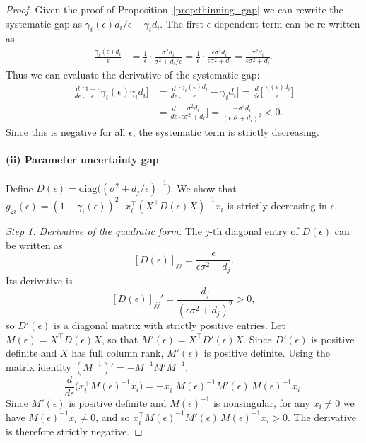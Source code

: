 \documentclass[11pt]{article}
\theoremstyle{plain}
\theoremstyle{definition}
\theoremstyle{remark}
\begin{document}
\begin{proof}
   Given the proof of Proposition~\ref{prop:thinning_gap} we can rewrite the systematic gap as $\gamma_i(\epsilon) d_i / \epsilon - \gamma_i d_i$. The first $\epsilon$ dependent term can be re-written as
\begin{align*}
\frac{\gamma_i(\epsilon) d_i }{\epsilon} &= \frac{1}{\epsilon} \cdot \frac{\sigma^2 d_i}{\sigma^2  + d_i / \epsilon } = \frac{1}{\epsilon} \cdot \frac{ \epsilon \sigma^2  d_i}{\epsilon \sigma^2  + d_i } = \frac{\sigma^2 d_i}{\epsilon \sigma^2  + d_i }.
\end{align*}
Thus we can evaluate the derivative of the systematic gap:
\begin{align*}
\frac{d}{d\epsilon}\Big[\frac{1-\epsilon}{\epsilon} \gamma_i(\epsilon) \gamma_i d_i\Big]
&= \frac{d}{d\epsilon}\Big[\frac{\gamma_i(\epsilon) d_i}{\epsilon} - \gamma_i d_i\Big]
 = \frac{d}{d\epsilon}\Big[\frac{\gamma_i(\epsilon) d_i}{\epsilon}\Big] \\
&= \frac{d}{d\epsilon}\Big[\frac{\sigma^2 d_i}{\epsilon\sigma^2 + d_i}\Big]
 = \frac{-\sigma^4 d_i}{(\epsilon\sigma^2 + d_i)^2} < 0.
\end{align*}
Since this is negative for all $\epsilon$, the systematic term is strictly decreasing.

\paragraph{(ii) Parameter uncertainty gap}

Define $D(\epsilon) = \mathrm{diag}\big((\sigma^2 + d_j/\epsilon)^{-1}\big)$.
We show that
$g_{2i}(\epsilon) = (1-\gamma_i(\epsilon))^2 \cdot x_i^\top (X^\top D(\epsilon) X)^{-1}x_i$
is strictly decreasing in $\epsilon$.

\textit{Step 1: Derivative of the quadratic form.}
The $j$-th diagonal entry of $D(\epsilon)$ can be written as
\[
[D(\epsilon)]_{jj} = \frac{\epsilon}{\epsilon\sigma^2 + d_j}.
\]
Its derivative is
\[
[D(\epsilon)]_{jj}' = \frac{d_j}{(\epsilon\sigma^2 + d_j)^2} > 0,
\]
so $D'(\epsilon)$ is a diagonal matrix with strictly positive
entries. Let $M(\epsilon) = X^\top D(\epsilon) X$, so that
$M'(\epsilon) = X^\top D'(\epsilon) X$. Since $D'(\epsilon)$ is
positive definite and $X$ has full column rank, $M'(\epsilon)$ is
positive definite. Using the matrix identity
$(M^{-1})' = -M^{-1}M'M^{-1}$,
\[
\frac{d}{d\epsilon}\big(x_i^\top M(\epsilon)^{-1}x_i\big)
= -x_i^\top M(\epsilon)^{-1} M'(\epsilon)\, M(\epsilon)^{-1}x_i.
\]
Since $M'(\epsilon)$ is positive definite and $M(\epsilon)^{-1}$ is
nonsingular, for any $x_i \neq 0$ we have
$M(\epsilon)^{-1}x_i \neq 0$, and so
$x_i^\top M(\epsilon)^{-1} M'(\epsilon)\, M(\epsilon)^{-1}x_i > 0$. The derivative is therefore strictly negative.


\end{proof}
\end{document}
